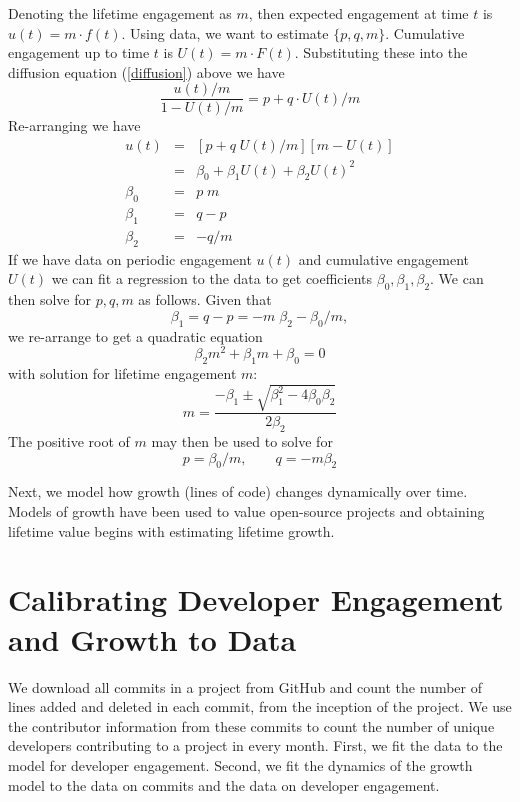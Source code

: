 \documentclass[conference]{IEEEtran}
\begin{document}
Denoting the lifetime engagement as $m$, then expected engagement at time $t$ is $u(t)=m \cdot f(t)$. Using data, we want to estimate $\{p,q,m\}$. Cumulative engagement up to time $t$ is $U(t)=m \cdot F(t)$. Substituting these into the diffusion equation (\ref{diffusion}) above we have 
\begin{equation}
\frac{u(t)/m}{1-U(t)/m} = p + q \cdot U(t)/m
\end{equation}
Re-arranging we have
\begin{eqnarray}
u(t) &=& [p+q \; U(t)/m][m-U(t)] \nonumber \\
 &=& \beta_0 + \beta_1 U(t) + \beta_2 U(t)^2 \\
\beta_0 &=& p\; m \\
\beta_1 &=& q-p \\
\beta_2 &=& -q/m
\end{eqnarray}
If we have data on periodic engagement $u(t)$ and cumulative engagement $U(t)$ we can fit a regression to the data to get coefficients $\beta_0, \beta_1, \beta_2$. We can then solve for $p,q,m$ as follows. Given that
\begin{equation}
\beta_1 = q-p = -m\; \beta_2 - \beta_0/m,
\end{equation}
we re-arrange to get a quadratic equation
\begin{equation}
\beta_2 m^2 + \beta_1 m + \beta_0 = 0
\end{equation}
with solution for lifetime engagement $m$:
\begin{equation}
m = \frac{-\beta_1 \pm \sqrt{\beta_1^2 - 4 \beta_0 \beta_2}}{2 \beta_2}
\end{equation}
The positive root of $m$ may then be used to solve for 
\begin{equation}
p = \beta_0/m,  \quad \quad q = -m \beta_2
\end{equation}

Next, we model how growth (lines of code) changes dynamically over time. Models of growth have been used to value open-source projects \citep{horowitz_software_2001, hoffmann_value_2024} and obtaining lifetime value begins with estimating lifetime growth. 



\section{Calibrating Developer Engagement and Growth to Data}
\label{sec:calibration}

We download all commits in a project from GitHub and count the number of lines added and deleted in each commit, from the inception of the project. We use the contributor information from these commits to count the number of unique developers contributing to a project in every month. First, we fit the data to the model for developer engagement. Second, we fit the dynamics of the growth model to the data on commits and the data on developer engagement. 
\end{document}
